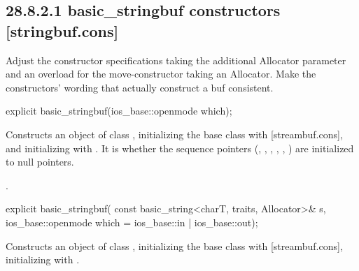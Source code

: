 \documentclass[ebook,11pt,article]{memoir}
\renewcommand{\iref}[1]{[#1]}
\begin{document}



\subsection{28.8.2.1 basic\_stringbuf constructors [stringbuf.cons]}
\begin{em}
Adjust the constructor specifications taking the additional Allocator parameter and an overload for the move-constructor taking an Allocator. Make the constructors' wording that actually construct a buf consistent.
\end{em}

\begin{itemdecl}
explicit basic_stringbuf(ios_base::openmode which);
\end{itemdecl}

\begin{itemdescr}
\pnum
\effects
Constructs an object of class
,
initializing the base class with
\iref{streambuf.cons}, and initializing
with .
It is
whether the sequence pointers
(, , ,
, , )
are initialized to null pointers.

\pnum
\ensures
{}.
\end{itemdescr}

\begin{itemdecl}
explicit basic_stringbuf(
  const basic_string<charT, traits, Allocator>& s,
  ios_base::openmode which = ios_base::in | ios_base::out);
\end{itemdecl}

\begin{itemdescr}
\pnum
\effects
Constructs an object of class
,
initializing the base class with
\iref{streambuf.cons},  initializing
with  .
\end{itemdescr}
\end{document}
